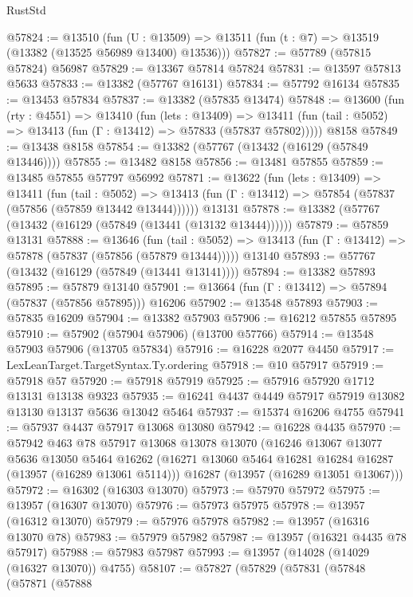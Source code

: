 \begin{lexlean}{RustStd}
\begin{coremodule}
@57824 := @13510
    (fun (U : @13509) => @13511 (fun (t : @7) => @13519 (@13382 (@13525 @56989 @13400) @13536)))
@57827 := @57789 (@57815 @57824) @56987
@57829 := @13367 @57814 @57824
@57831 := @13597 @57813 @5633
@57833 := @13382 (@57767 @16131)
@57834 := @57792 @16134
@57835 := @13453 @57834
@57837 := @13382 (@57835 @13474)
@57848 := @13600
    (fun (rty : @4551) =>
    @13410
      (fun (lets : @13409) =>
      @13411 (fun (tail : @5052) => @13413 (fun (Γ : @13412) => @57833 (@57837 @57802)))))
    @8158
@57849 := @13438 @8158
@57854 := @13382 (@57767 (@13432 (@16129 (@57849 @13446))))
@57855 := @13482 @8158
@57856 := @13481 @57855
@57859 := @13485 @57855 @57797 @56992
@57871 := @13622
    (fun (lets : @13409) =>
    @13411
      (fun (tail : @5052) =>
      @13413 (fun (Γ : @13412) => @57854 (@57837 (@57856 (@57859 @13442 @13444))))))
    @13131
@57878 := @13382 (@57767 (@13432 (@16129 (@57849 (@13441 (@13132 @13444))))))
@57879 := @57859 @13131
@57888 := @13646
    (fun (tail : @5052) => @13413 (fun (Γ : @13412) => @57878 (@57837 (@57856 (@57879 @13444)))))
    @13140
@57893 := @57767 (@13432 (@16129 (@57849 (@13441 @13141))))
@57894 := @13382 @57893
@57895 := @57879 @13140
@57901 := @13664 (fun (Γ : @13412) => @57894 (@57837 (@57856 @57895))) @16206
@57902 := @13548 @57893
@57903 := @57835 @16209
@57904 := @13382 @57903
@57906 := @16212 @57855 @57895
@57910 := @57902 (@57904 @57906) (@13700 @57766)
@57914 := @13548 @57903 @57906 (@13705 @57834)
@57916 := @16228 @2077 @4450
@57917 := LexLeanTarget.TargetSyntax.Ty.ordering
@57918 := @10 @57917
@57919 := @57918 @57
@57920 := @57918 @57919
@57925 := @57916 @57920 @1712 @13131 @13138 @9323
@57935 := @16241 @4437 @4449 @57917 @57919 @13082 @13130 @13137 @5636 @13042 @5464
@57937 := @15374 @16206 @4755
@57941 := @57937 @4437 @57917 @13068 @13080
@57942 := @16228 @4435
@57970 := @57942
    @463
    @78
    @57917
    @13068
    @13078
    @13070
    (@16246
      @13067
      @13077
      @5636
      @13050
      @5464
      @16262
      (@16271 @13060 @5464 @16281 @16284 @16287 (@13957 (@16289 @13061 @5114)))
      @16287
      (@13957 (@16289 @13051 @13067)))
@57972 := @16302 (@16303 @13070)
@57973 := @57970 @57972
@57975 := @13957 (@16307 @13070)
@57976 := @57973 @57975
@57978 := @13957 (@16312 @13070)
@57979 := @57976 @57978
@57982 := @13957 (@16316 @13070 @78)
@57983 := @57979 @57982
@57987 := @13957 (@16321 @4435 @78 @57917)
@57988 := @57983 @57987
@57993 := @13957 (@14028 (@14029 (@16327 @13070)) @4755)
@58107 := @57827
    (@57829
      (@57831
        (@57848
          (@57871
            (@57888

\end{coremodule}
\end{lexlean}
